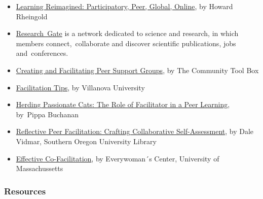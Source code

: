 \begin{itemize}
\item
  \href{http://dmlcentral.net/blog/howard-rheingold/learning-reimagined-participatory-peer-global-online}{Learning
  Reimagined: Participatory, Peer, Global, Online}, by Howard Rheingold
\item
  \href{http://www.researchgate.net/}{Research~Gate} is a network
  dedicated to science and research, in which members
  connect,~collaborate and discover scientific publications, jobs
  and~conferences.
\item
  \href{http://ctb.ku.edu/en/tablecontents/section\_1180.aspx}{Creating
  and Facilitating Peer Support Groups}, by The Community Tool Box
\item
  \href{http://www1.villanova.edu/content/villanova/artsci/vcle/resources/toolkit/\_jcr\_content/pagecontent/download\_8/file.res/FacilitationTips.doc}{Facilitation
  Tips}, by Villanova University
\item
  \href{http://pippabuchanan.com/2011/09/04/herding-passionate-cats-the-role-of-facilitator-in-a-peer-learning-process/}{Herding
  Passionate Cats: The Role of Facilitator in a Peer Learning}, by~Pippa
  Buchanan
\item
  \href{http://webpages.sou.edu/~vidmar/SOARS2008/vidmar.ppt}{Reflective
  Peer Facilitation: Crafting Collaborative Self-Assessment}, by Dale
  Vidmar, Southern Oregon University Library
\item
  \href{http://www.umass.edu/ewc/ea/Facilitation\%20Skills/important\%20tips.doc}{Effective
  Co-Facilitation}, by Everywoman´s Center, University of Massachussetts
\end{itemize}

\subsubsection{Resources}


